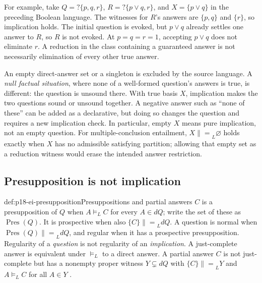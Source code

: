 For example, take \(Q=?\{p,q,r\}\), \(R=?\{p\lor q,r\}\), and
\(X=\{p\lor q\}\) in the preceding Boolean language. The witnesses
for \(R\)'s answers are \(\{p,q\}\) and \(\{r\}\), so implication
holds. The initial question is evoked, but \(p\lor q\) already settles
one answer to \(R\), so \(R\) is not evoked. At \(p=q=r=1\), accepting
\(p\lor q\) does not eliminate \(r\). A reduction in the class containing
a guaranteed answer is not necessarily elimination of every other true answer.

An empty direct-answer set or a singleton is excluded by the source language.
A \emph{null factual situation}, where none of a well-formed question's
answers is true, is different: the question is unsound there. With true basis
\(X\), implication makes the two questions sound or unsound together. A
negative answer such as ``none of these'' can be added as a declarative, but
doing so changes the question and requires a new implication check. In
particular, empty \(X\) means pure implication, not an empty question.
For multiple-conclusion entailment, \(X\mathrel{\|=}_L\varnothing\) holds
exactly when \(X\) has no admissible satisfying partition; allowing that
empty set as a reduction witness would erase the intended answer restriction.

\subsection{Presupposition is not implication}

\begin{hbdefinition}{def:p18-ei-presupposition}{Presuppositions and partial answers}
\(C\) is a presupposition of \(Q\) when \(A\models_L C\) for every
\(A\in dQ\); write the set of these as \(\operatorname{Pres}(Q)\).
It is prospective when also \(\{C\}\mathrel{\|=}_L dQ\).
A question is normal when
\(\operatorname{Pres}(Q)\mathrel{\|=}_L dQ\), and regular when it has a
prospective presupposition. Regularity of a \emph{question} is not regularity
of an \emph{implication}. A just-complete answer is equivalent under
\(\models_L\) to a direct answer. A partial answer \(C\) is not
just-complete but has a nonempty proper witness \(Y\subsetneq dQ\) with
\(\{C\}\mathrel{\|=}_L Y\) and \(A\models_L C\) for all \(A\in Y\)
\cite[pp.~15--17]{Wisniewski2001QuestionsInferences}.
\end{hbdefinition}

